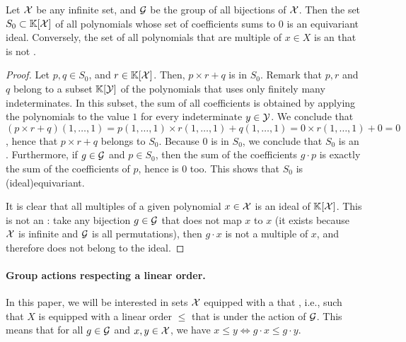 \begin{example}
    \label{ex:idl-equiv}
    Let $\mathcal{X}$ be any infinite set, and $\mathcal{G}$ be the 
    group of all bijections of $\mathcal{X}$. 
    Then the set $S_0 \subset \mathbb{K}[\mathcal{X}]$ of all polynomials 
    whose set of coefficients sums to $0$ is an equivariant ideal.
    Conversely, the set of all polynomials that are multiple
    of $x \in X$ is an  that is not .
\end{example}
\begin{proof}
    Let $p,q\in S_0$, and $r \in \mathbb{K}[\mathcal{X}]$.
    Then, $p \times r + q$ is in $S_0$. Remark that 
    $p,r$ and $q$ belong to a subset $\mathbb{K}[\mathcal{Y}]$ of the 
    polynomials that uses only finitely many indeterminates.
    In this subset, the sum of all coefficients is obtained
    by applying the polynomials to the value $1$ for every indeterminate
    $y \in \mathcal{Y}$. We conclude that
    $(p \times r + q)(1,\dots, 1) 
    = p(1,\dots,1) \times r(1,\dots,1) + q(1,\dots,1)
    = 0 \times r(1, \dots, 1) + 0 = 0$, hence that
    $p \times r + q$ belongs to $S_0$. 
    Because $0$ is in $S_0$, we conclude that $S_0$ is an .
    Furthermore, if $g \in \mathcal{G}$ and $p \in S_0$, then
    the sum of the coefficients $g \cdot p$ is exactly
    the sum of the coefficients of $p$, hence is $0$ too.
    This shows that $S_0$ is \kl(ideal){equivariant}.

    It is clear that all multiples of a given polynomial $x \in \mathcal{X}$
    is an ideal of $\mathbb{K}[\mathcal{X}]$. This is not an :
    take any bijection $g \in \mathcal{G}$ that does not map $x$ to $x$ (it
    exists because $\mathcal{X}$ is infinite and $\mathcal{G}$ is all permutations),
    then $g \cdot x$ is not a multiple of $x$, and therefore does 
    not belong to the ideal.
\end{proof}


\paragraph{Group actions respecting a linear order.} In this paper, we will be
interested in sets $\mathcal{X}$ equipped with a  that , i.e., such that $X$ is equipped with a linear order $\leq$
that is  under the action of $\mathcal{G}$. This means that for all $g
\in \mathcal{G}$ and $x,y \in \mathcal{X}$, we have $x \leq y \iff g \cdot x \leq g \cdot y$.

